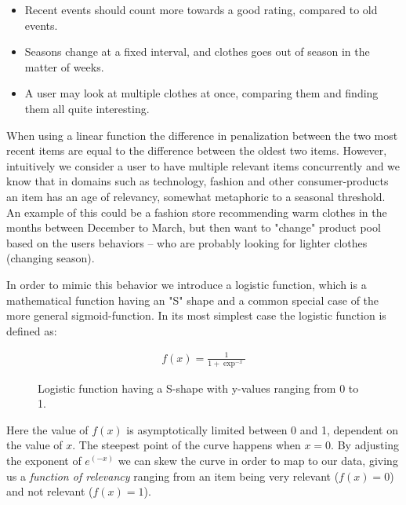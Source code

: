 \begin{itemize}
  \item Recent events should count more towards a good rating, compared to old
  events.
  \item Seasons change at a fixed interval, and clothes goes out of season in
  the matter of weeks.
  \item A user may look at multiple clothes at once, comparing them and finding
  them all quite interesting.
\end{itemize}

When using a linear function the difference in penalization between the two
most recent items are equal to the difference between the oldest two items.
However, intuitively we consider a user to have multiple relevant items
concurrently and we know that in domains such as technology, fashion and other
consumer-products an item has an age of relevancy, somewhat metaphoric to a
seasonal threshold. An example of this could be a fashion store recommending
warm clothes in the months between December to March, but then want to "change"
product pool based on the users behaviors -- who are probably looking for
lighter clothes (changing season).

In order to mimic this behavior we introduce a logistic function, which is a
mathematical function having an "S" shape and a common special case of the more
general sigmoid-function. In its most simplest case the logistic function is
defined as:

\begin{figure}[H]
  \centering
  \noindent\begin{minipage}{.45\textwidth}
  \end{minipage}
  \begin{minipage}{.45\textwidth}
  \begin{align}
    \label{logistic-function}
    f(x) = \frac{1}{1+\exp^{-x}}
  \end{align}
  \end{minipage}
  \caption{Logistic function having a S-shape with y-values ranging
  from 0 to 1.}
\end{figure}

Here the value of $f(x)$ is asymptotically limited between 0 and 1, dependent
on the value of $x$. The steepest point of the curve happens when $x=0$. By
adjusting the exponent of $e^{(-x)}$ we can skew the curve in order to map to our
data, giving us a \textit{function of relevancy} ranging from an item being
very relevant ($f(x)=0$) and not relevant ($f(x)=1$).

